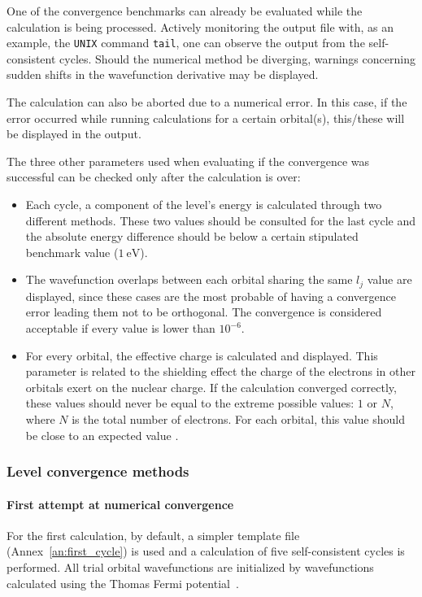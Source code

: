 One of the convergence benchmarks can already be evaluated while the calculation is being processed. Actively monitoring the output file with, as an example, the \verb|UNIX| command \verb|tail|, one can observe the output from the self-consistent cycles. Should the numerical method be diverging, warnings concerning sudden shifts in the wavefunction derivative may be displayed.

The calculation can also be aborted due to a numerical error. In this case, if the error occurred while running calculations for a certain orbital(s), this/these will be displayed in the output. 

The three other parameters used when evaluating if the convergence was successful can be checked only after the calculation is over:

\begin{itemize}
    \item Each cycle, a component of the level's energy is calculated through two different methods. These two values should be consulted for the last cycle and the absolute energy difference should be below a certain stipulated benchmark value ($1\ \si{\electronvolt}$).
    \item The wavefunction overlaps between each orbital sharing the same $l_j$ value are displayed, since these cases are the most probable of having a convergence error leading them not to be orthogonal. The convergence is considered acceptable if every value is lower than $10^{-6}$.
    \item For every orbital, the effective charge is calculated and displayed. This parameter is related to the shielding effect the charge of the electrons in other orbitals exert on the nuclear charge. If the calculation converged correctly, these values should never be equal to the extreme possible values: $1$ or $N$, where $N$ is the total number of electrons. For each orbital, this value should be close to an expected value .
\end{itemize}





\subsubsection{Level convergence methods}

\paragraph{First attempt at numerical convergence}
For the first calculation, by default, a simpler template file (Annex~\ref{an:first_cycle}) is used and a calculation of five self-consistent cycles is performed. All  trial orbital wavefunctions are initialized by wavefunctions calculated using the Thomas Fermi potential~\cite{thomas_1927}.






